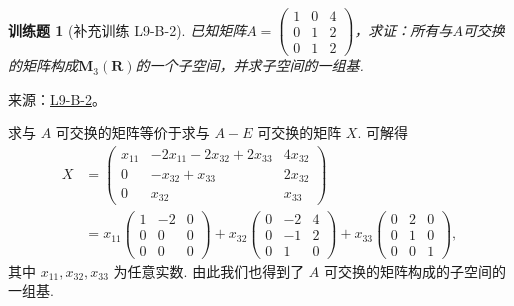 \documentclass[UTF8,12pt,a4paper,fontset=fandol]{ctexart}
\newtheorem{exercise}{训练题}[section]
\begin{document}
\begin{exercise}[补充训练 L9-B-2]\label{prob:L9-B-2}
已知矩阵$A=\begin{pmatrix}
                1 & 0 & 4 \\ 0 & 1 & 2 \\ 0 & 1 & 2
            \end{pmatrix}$，求证：所有与$A$可交换的矩阵构成$\mathbf{M}_3(\mathbf{R})$的一个子空间，并求子空间的一组基.
\end{exercise}
\noindent 来源：\href{https://github.com/yhwu-is/Linear-Algebra-Left-Undone/blob/new/%E8%AE%B2%E4%B9%89/%E4%B8%93%E9%A2%98/9%20%E7%9F%A9%E9%98%B5%E8%BF%90%E7%AE%97%E8%BF%9B%E9%98%B6.tex}{L9-B-2}。
\begin{solve}
求与 $ A $ 可交换的矩阵等价于求与 $ A - E $ 可交换的矩阵 $ X $. 可解得
            \begin{align*}
                X & = \begin{pmatrix}
                            x_{11} & -2x_{11} - 2x_{32} + 2x_{33} & 4x_{32} \\
                            0      & -x_{32} + x_{33}             & 2x_{32} \\
                            0      & x_{32}                       & x_{33}
                        \end{pmatrix} \\
                    & = x_{11} \begin{pmatrix}
                                1 & -2 & 0 \\
                                0 & 0  & 0 \\
                                0 & 0  & 0
                            \end{pmatrix}
                + x_{32} \begin{pmatrix}
                            0 & -2 & 4 \\
                            0 & -1 & 2 \\
                            0 & 1  & 0
                        \end{pmatrix}
                + x_{33} \begin{pmatrix}
                            0 & 2 & 0 \\
                            0 & 1 & 0 \\
                            0 & 0 & 1
                        \end{pmatrix},
            \end{align*}
            其中 $ x_{11}, x_{32}, x_{33} $ 为任意实数. 由此我们也得到了 $ A $ 可交换的矩阵构成的子空间的一组基.
\end{solve}
\end{document}
